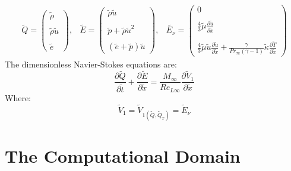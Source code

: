 \documentclass[11pt, a4paper]{article}
\newcommand{\parder}[2]{\frac{\partial {#1}}{\partial {#2}}}
\begin{document}
\begin{equation}
    \begin{matrix}
        \tilde{Q}=\begin{pmatrix}
        \tilde{\rho} \\\\
        \tilde{\rho}\tilde{u} \\\\
        \tilde{e}
        \end{pmatrix}, & \tilde{E}=\begin{pmatrix}
        \tilde{\rho}\tilde{u} \\\\
        \tilde{p}+\tilde{\rho}\tilde{u}^2 \\\\
        \left(\tilde{e}+\tilde{p}\right)\tilde{u}
        \end{pmatrix}, & \tilde{E_\nu}=\begin{pmatrix}
        0 \\\\
        \displaystyle\frac{4}{3}\tilde{\mu} \parder{\tilde{u}}{\tilde{x}} \\\\
        \displaystyle\frac{4}{3}\tilde{\mu}\tilde{u}\parder{\tilde{u}}{\tilde{x}}+\frac{\gamma}{Pr_\infty\left(\gamma-1\right)}\tilde{\kappa}\parder{\tilde{T}}{\tilde{x}}
        \end{pmatrix}
    \end{matrix}
\end{equation}
The dimensionless Navier-Stokes equations are:
\begin{equation}
    \parder{\tilde{Q}}{\tilde{t}}+\parder{\tilde{E}}{\tilde{x}}=\frac{M_\infty}{Re_{L\infty}}\parder{\tilde{V}_1}{\tilde{x}}
    \label{eq: normalized N-S}
\end{equation}
Where:
\begin{equation*}
    \tilde{V}_1=\tilde{V}_{1\left(\tilde{Q},\tilde{Q}_x\right)}=\tilde{E}_\nu
\end{equation*}

\section{The Computational Domain}
\end{document}
